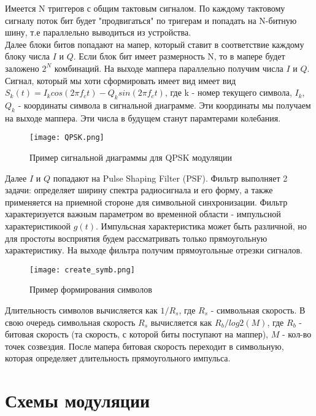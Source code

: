 Имеется N триггеров с общим тактовым сигналом. По каждому тактовому сигналу поток бит будет "продвигаться" по тригерам и попадать
на N-битную шину, т.е параллельно выводиться из устройства. \\

Далее блоки битов попадают на мапер, который ставит в соответствие каждому блоку числа $I$ и $Q$. Если блок бит имеет размерность N,
то в мапере будет заложено $2^N$ комбинаций. На выходе маппера параллельно получим числа $I$ и $Q$. \\

Сигнал, который мы хоти сформировать имеет вид имеет вид $S_k(t) = I_kcos(2\pi f_ct) - Q_ksin(2\pi f_ct)$, где k - номер текущего символа, 
$I_k$, $Q_k$ - координаты символа в сигнальной диаграмме. Эти координаты мы получаем на выходе маппера. Эти числа в будущем станут парамтерами колебания.

\begin{figure}[H]
    \centering
    \texttt{[image: QPSK.png]}
    \caption{Пример сигнальной диаграммы для QPSK модуляции}
\end{figure}

Далее $I$ и $Q$ попадают на Pulse Shaping Filter (PSF). Фильтр выполняет 2 задачи: определяет ширину спектра радиосигнала и его форму, а также применяется
на приемной стороне для символьной синхронизации. Фильтр характеризуется важным параметром во временной области - импульсной характеристикоой $g(t)$.
Импульсная характеристика может быть различной, но для простоты восприятия будем рассматривать только прямоугольную характеристику.
На выходе фильтра получим прямоугольные отрезки сигналов. \\

\begin{figure}[H]
    \centering
    \texttt{[image: create\_symb.png]}
    \caption{Пример формирования символов}
\end{figure}

Длительность символов вычисляется как $1/R_s$, где $R_s$ - символьная скорость. В свою очередь символьная скорость $R_s$ вычисляется
как $R_b/log2(M)$, где $R_b$ - битовая скорость (та скорость, с которой биты поступают на маппер), $M$ - кол-во точек созвездия.
После мапера битовая скорость переходит в символьную, которая определяет длительность прямоугольного импульса.

\section*{\textbf{Схемы модуляции}}

